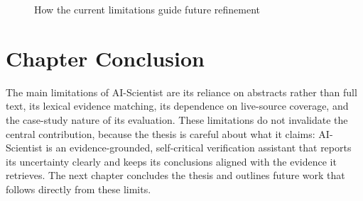 \begin{figure}[!htbp]
\centering
{}
\caption{How the current limitations guide future refinement}
\label{fig:limitations_flow}
\end{figure}

\section{Chapter Conclusion }

The main limitations of AI-Scientist are its reliance on abstracts rather than full text, its lexical evidence
matching, its dependence on live-source coverage, and the case-study nature of its evaluation. These limitations do
not invalidate the central contribution, because the thesis is careful about what it claims: AI-Scientist is an
evidence-grounded, self-critical verification assistant that reports its uncertainty clearly and keeps its
conclusions aligned with the evidence it retrieves. The next chapter concludes the thesis and outlines future work
that follows directly from these limits.


